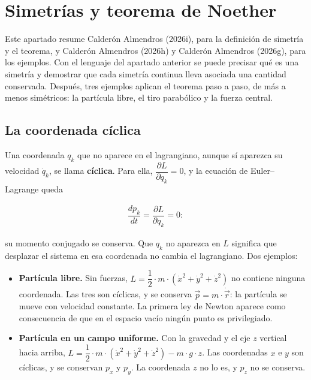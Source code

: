 \documentclass[11pt,a4paper,spanish]{book}
\providecommand{\tightlist}{%
  \setlength{\itemsep}{0pt}\setlength{\parskip}{0pt}}
\begin{document}
\section{Simetrías y teorema de
Noether}\label{simetruxedas-y-teorema-de-noether}

Este apartado resume Calderón Almendros (2026i), para la definición de
simetría y el teorema, y Calderón Almendros (2026h) y Calderón Almendros
(2026g), para los ejemplos. Con el lenguaje del apartado anterior se
puede precisar qué es una simetría y demostrar que cada simetría
continua lleva asociada una cantidad conservada. Después, tres ejemplos
aplican el teorema paso a paso, de más a menos simétricos: la partícula
libre, el tiro parabólico y la fuerza central.

\subsection{La coordenada cíclica}\label{la-coordenada-cuxedclica}

Una coordenada \(q_k\) que no aparece en el lagrangiano, aunque sí
aparezca su velocidad \(\dot{q}_k\), se llama \textbf{cíclica}. Para
ella, \(\dfrac{\partial L}{\partial q_k} = 0\), y la ecuación de
Euler--Lagrange queda

\[
\begin{aligned}
\dfrac{dp_k}{dt} = \dfrac{\partial L}{\partial q_k} = 0:
\end{aligned}
\]

su momento conjugado se conserva. Que \(q_k\) no aparezca en \(L\)
significa que desplazar el sistema en esa coordenada no cambia el
lagrangiano. Dos ejemplos:

\begin{itemize}
\tightlist
\item
  \textbf{Partícula libre.} Sin fuerzas,
  \(L = \dfrac{1}{2} \cdot m \cdot (\dot{x}^2 + \dot{y}^2 + \dot{z}^2)\)
  no contiene ninguna coordenada. Las tres son cíclicas, y se conserva
  \(\vec{p} = m \cdot \dot{\vec{r}}\): la partícula se mueve con
  velocidad constante. La primera ley de Newton aparece como
  consecuencia de que en el espacio vacío ningún punto es privilegiado.
\item
  \textbf{Partícula en un campo uniforme.} Con la gravedad y el eje
  \(z\) vertical hacia arriba,
  \(L = \dfrac{1}{2} \cdot m \cdot (\dot{x}^2 + \dot{y}^2 + \dot{z}^2) - m \cdot g \cdot z\).
  Las coordenadas \(x\) e \(y\) son cíclicas, y se conservan \(p_x\) y
  \(p_y\). La coordenada \(z\) no lo es, y \(p_z\) no se conserva.
\end{itemize}
\end{document}

